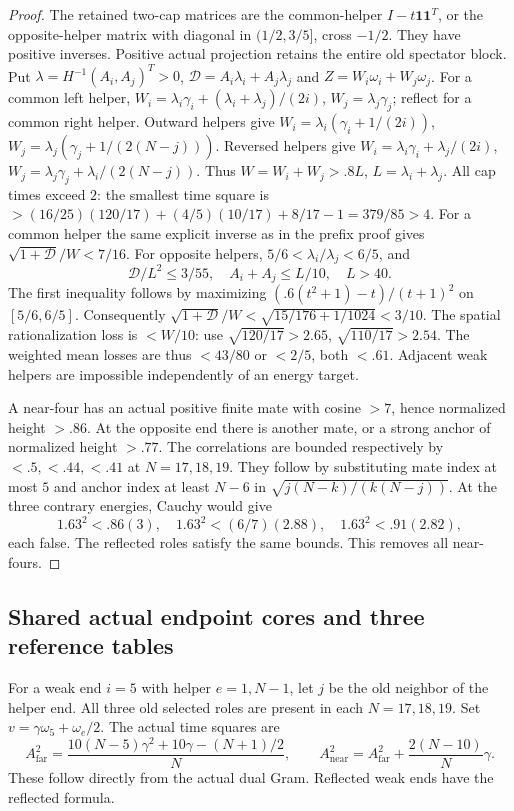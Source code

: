 \documentclass[11pt]{article}
\theoremstyle{definition}
\theoremstyle{remark}
\begin{document}
\begin{proof}
The retained two-cap matrices are the common-helper
\(I-t\mathbf1\mathbf1^T\), or the opposite-helper
matrix with diagonal in \((1/2,3/5]\), cross \(-1/2\).
 They have positive inverses. Positive actual projection
 retains the entire old spectator block.
 Put \(\lambda=H^{-1}(A_i,A_j)^T>0\),
 \(\mathcal D=A_i\lambda_i+A_j\lambda_j\) and
 \(Z=W_i\omega_i+W_j\omega_j\).
 For a common left helper,
 \(W_i=\lambda_i\gamma_i+(\lambda_i+\lambda_j)/(2i)\),
 \(W_j=\lambda_j\gamma_j\); reflect for a common right helper.
 Outward helpers give
 \(W_i=\lambda_i(\gamma_i+1/(2i))\),
 \(W_j=\lambda_j(\gamma_j+1/(2(N-j)))\).
 Reversed helpers give
 \(W_i=\lambda_i\gamma_i+\lambda_j/(2i)\),
 \(W_j=\lambda_j\gamma_j+\lambda_i/(2(N-j))\).
 Thus \(W=W_i+W_j>.8L\), \(L=\lambda_i+\lambda_j\).
 All cap times exceed \(2\): the smallest time square is
 \(>(16/25)(120/17)+(4/5)(10/17)+8/17-1
 =379/85>4\).
 For a common helper the same explicit inverse as in
 the prefix proof gives \(\sqrt{1+\mathcal D}/W<7/16\).
 For opposite helpers,
 \(5/6<\lambda_i/\lambda_j<6/5\), and
 \[
 \mathcal D/L^2\leq3/55,\quad
 A_i+A_j\leq L/10,\quad L>40.
 \]
 The first inequality follows by maximizing
 \((.6(t^2+1)-t)/(t+1)^2\) on \([5/6,6/5]\).
 Consequently
 \(\sqrt{1+\mathcal D}/W
 <\sqrt{15/176+1/1024}<3/10\).
The spatial rationalization loss is \(<W/10\):
use \(\sqrt{120/17}>2.65\),
\(\sqrt{110/17}>2.54\).
The weighted mean losses are thus \(<43/80\)
or \(<2/5\), both \(<.61\). Adjacent weak helpers
are impossible independently of an energy target.

A near-four has an actual positive finite mate
with cosine \(>7\), hence normalized height \(>.86\).
At the opposite end there is another mate, or a
strong anchor of normalized height \(>.77\).
The correlations are bounded respectively by
\(<.5,<.44,<.41\) at \(N=17,18,19\).
They follow by substituting mate index at most
\(5\) and anchor index at least \(N-6\) in
\(\sqrt{j(N-k)/(k(N-j))}\).
At the three contrary energies, Cauchy would give
\[
 1.63^2<.86(3),\quad
 1.63^2<(6/7)(2.88),\quad
 1.63^2<.91(2.82),
\]
each false. The reflected roles satisfy the same
bounds. This removes all near-fours.
\end{proof}

\subsection{Shared actual endpoint cores and three reference tables}
\label{app:Aendpointcores}
For a weak end \(i=5\) with helper \(e=1,N-1\), let \(j\)
be the old neighbor of the helper end. All three old
selected roles are present in each \(N=17,18,19\).
Set \(v=\gamma\omega_5+\omega_e/2\). The actual
time squares are
\begin{equation}\label{app:eq:Aendtimes}
 A_{\mathrm{far}}^2=
 \frac{10(N-5)\gamma^2+10\gamma-(N+1)/2}{N},\qquad
 A_{\mathrm{near}}^2=A_{\mathrm{far}}^2+
                        \frac{2(N-10)}N\gamma.
\end{equation}
These follow directly from the actual dual Gram.
Reflected weak ends have the reflected formula.
\end{document}
